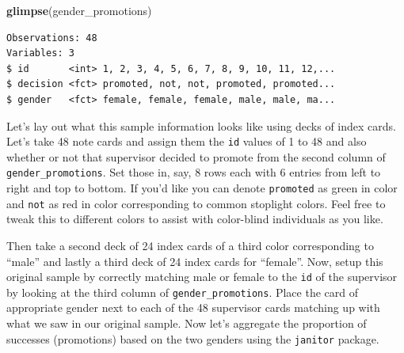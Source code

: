 \documentclass[12pt, krantz2,]{krantz}
\makeatletter
\newenvironment{Shaded}{\begin{snugshade}}{\end{snugshade}}
\newcommand{\CommentTok}[1]{\textcolor[rgb]{0.37,0.37,0.37}{\textit{#1}}}
\newcommand{\KeywordTok}[1]{\textcolor[rgb]{0.27,0.27,0.27}{\textbf{#1}}}
\newcommand{\NormalTok}[1]{#1}
\newcommand{\OperatorTok}[1]{\textcolor[rgb]{0.43,0.43,0.43}{\textbf{#1}}}
\newcommand{\StringTok}[1]{\textcolor[rgb]{0.5,0.5,0.5}{#1}}
\newenvironment{kframe}{%
\medskip{}
\setlength{\fboxsep}{.8em}
 \def\at@end@of@kframe{}%
 \ifinner\ifhmode%
  \def\at@end@of@kframe{\end{minipage}}%
  \begin{minipage}{\columnwidth}%
 \fi\fi%
 \def\FrameCommand##1{\hskip\@totalleftmargin \hskip-\fboxsep
 \colorbox{shadecolor}{##1}\hskip-\fboxsep
     \hskip-\linewidth \hskip-\@totalleftmargin \hskip\columnwidth}%
 \MakeFramed {\advance\hsize-\width
   \@totalleftmargin\z@ \linewidth\hsize
   \@setminipage}}%
 {\par\unskip\endMakeFramed%
 \at@end@of@kframe}
\renewenvironment{Shaded}{\begin{kframe}}{\end{kframe}}
\makeatother
\begin{document}
\begin{Shaded}
\begin{Highlighting}[]
\KeywordTok{glimpse}\NormalTok{(gender_promotions)}
\end{Highlighting}
\end{Shaded}

\begin{verbatim}
Observations: 48
Variables: 3
$ id       <int> 1, 2, 3, 4, 5, 6, 7, 8, 9, 10, 11, 12,...
$ decision <fct> promoted, not, not, promoted, promoted...
$ gender   <fct> female, female, female, male, male, ma...
\end{verbatim}

Let's lay out what this sample information looks like using decks of index cards. Let's take 48 note cards and assign them the \texttt{id} values of 1 to 48 and also whether or not that supervisor decided to promote from the second column of \texttt{gender\_promotions}. Set those in, say, 8 rows each with 6 entries from left to right and top to bottom. If you'd like you can denote \texttt{promoted} as green in color and \texttt{not} as red in color corresponding to common stoplight colors. Feel free to tweak this to different colors to assist with color-blind individuals as you like.

Then take a second deck of 24 index cards of a third color corresponding to ``male'' and lastly a third deck of 24 index cards for ``female''. Now, setup this original sample by correctly matching male or female to the \texttt{id} of the supervisor by looking at the third column of \texttt{gender\_promotions}. Place the card of appropriate gender next to each of the 48 supervisor cards matching up with what we saw in our original sample. Now let's aggregate the proportion of successes (promotions) based on the two genders using the \texttt{janitor} package.

\begin{Shaded}
\end{Shaded}
\end{document}
